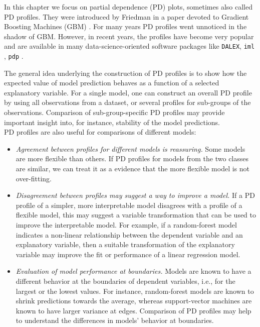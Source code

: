 \documentclass[]{krantz}
\providecommand{\tightlist}{%
  \setlength{\itemsep}{0pt}\setlength{\parskip}{0pt}}
\begin{document}
In this chapter we focus on partial dependence (PD) plots, sometimes also called PD profiles. They were introduced by Friedman in a paper devoted to Gradient Boosting Machines (GBM) \citep{Friedman00greedyfunction}. For many years PD profiles went unnoticed in the shadow of GBM. However, in recent years, the profiles have become very popular and are available in many data-science-oriented software packages like \texttt{DALEX}, \texttt{iml} \citep{imlRPackage}, \texttt{pdp} \citep{pdpRPackage}.

The general idea underlying the construction of PD profiles is to show how the expected value of model prediction behaves as a function of a selected explanatory variable. For a single model, one can construct an overall PD profile by using all observations from a dataset, or several profiles for sub-groups of the observations. Comparison of sub-group-specific PD profiles may provide important insight into, for instance, stability of the model predictions.\\
PD profiles are also useful for comparisons of different models:

\begin{itemize}
\tightlist
\item
  \emph{Agreement between profiles for different models is reassuring.} Some models are more flexible than others. If PD profiles for models from the two classes are similar, we can treat it as a evidence that the more flexible model is not over-fitting.
\item
  \emph{Disagreement between profiles may suggest a way to improve a model.} If a PD profile of a simpler, more interpretable model disagrees with a profile of a flexible model, this may suggest a variable transformation that can be used to improve the interpretable model. For example, if a random-forest model indicates a non-linear relationship between the dependent variable and an explanatory variable, then a suitable transformation of the explanatory variable may improve the fit or performance of a linear regression model.
\item
  \emph{Evaluation of model performance at boundaries.} Models are known to have a different behavior at the boundaries of dependent variables, i.e., for the largest or the lowest values. For instance, random-forest models are known to shrink predictions towards the average, whereas support-vector machines are known to have larger variance at edges. Comparison of PD profiles may help to understand the differences in models' behavior at boundaries.
\end{itemize}
\end{document}
